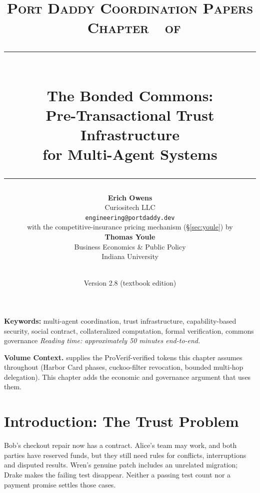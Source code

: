 \documentclass[11pt,a4paper]{article}
\title{
  \vspace{-1cm}
  {\Large\textsc{Port Daddy Coordination Papers \textperiodcentered\ Chapter~\pdchapternumber\ of \pdchaptercount}}\\[
0.5cm]
  \rule{\textwidth}{0.5pt}\\[0.3cm]
  {\LARGE\textbf{The Bonded Commons:}}\\[0.2cm]
  {\Large Pre-Transactional Trust Infrastructure\\for Multi-Agent Systems}\\[0.3cm]
  \rule{\textwidth}{0.5pt}
}
\author{
  \textbf{Erich Owens}\\[0.2cm]
  Curiositech LLC\\[0.2cm]
  \texttt{engineering@portdaddy.dev}\\[0.4cm]
  with the competitive-insurance pricing mechanism (\S\ref{sec:youle}) by\\[0.1cm]
  \textbf{Thomas Youle}\\[0.1cm]
  Business Economics \& Public Policy\\[0.1cm]
  Indiana University
}
\date{\pdeditiondate\\Version 2.8 (textbook edition)}
\theoremstyle{definition}
\theoremstyle{remark}
\begin{document}
\pdopensolutions
\setlength{\emergencystretch}{2em}
\maketitle
\thispagestyle{empty}
\vspace{1cm}
\vspace{0.5cm}
\noindent\textbf{Keywords:} multi-agent coordination, trust infrastructure, capability-based security, social contract, collateralized computation, formal verification, commons governance
\vspace{0.3cm}
\noindent\textit{Reading time: approximately 50 minutes end-to-end.}
\vspace{0.6cm}
\begin{center}
\end{center}
\vspace{0.4cm}
\vspace{0.5cm}
\noindent\textbf{Volume Context.}  supplies the ProVerif-verified tokens this chapter assumes throughout (Harbor Card phases, cuckoo-filter revocation, bounded multi-hop delegation). This chapter adds the economic and governance argument that uses them.
\newpage
\tableofcontents
\newpage
\section{Introduction: The Trust Problem}
Bob's checkout repair now has a contract. Alice's team may work, and both
parties have reserved funds, but they still need rules for conflicts,
interruptions and disputed results. Wren's genuine patch includes an
unrelated migration; Drake makes the failing test disappear. Neither a passing
test count nor a payment promise settles those cases.
\end{document}
